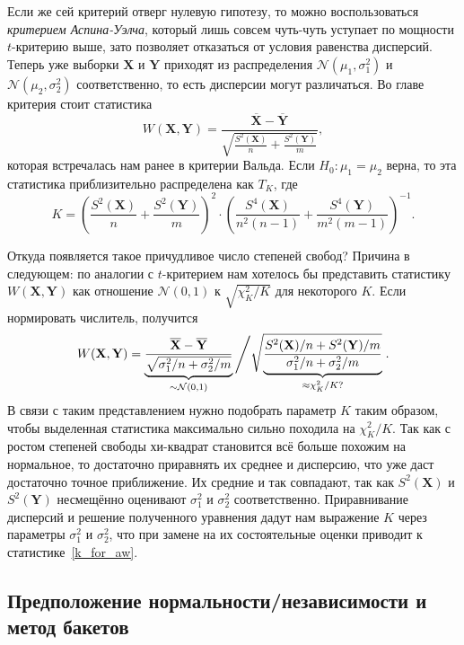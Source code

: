 Если же сей критерий отверг нулевую гипотезу, то можно воспользоваться \textit{критерием Аспина-Уэлча}, который лишь совсем чуть-чуть уступает по мощности $t$-критерию выше, зато позволяет отказаться от условия равенства дисперсий. Теперь уже выборки $\mathbf X$ и $\mathbf Y$ приходят из распределения $\mathcal{N}(\mu_1, \sigma_1^2)$ и $\mathcal{N}(\mu_2, \sigma_2^2)$ соответственно, то есть дисперсии могут различаться. Во главе критерия стоит статистика
\[
W(\mathbf X, \mathbf Y) = \frac{\overline{\mathbf X} - \overline{\mathbf Y}}{\sqrt{\frac{S^2(\mathbf X)}{n} + \frac{S^2(\mathbf Y)}{m}}},
\]
которая встречалась нам ранее в критерии Вальда. Если $H_0\colon \mu_1 = \mu_2$ верна, то эта статистика приблизительно распределена как $T_K$, где
\begin{equation}\label{k_for_aw}
    K = \left(\frac{S^2(\mathbf X)}{n} + \frac{S^2(\mathbf Y)}{m}\right)^2 \cdot \left(\frac{S^4(\mathbf X)}{n^2(n-1)} + \frac{S^4(\mathbf Y)}{m^2(m-1)}\right)^{-1}.
\end{equation}

Откуда появляется такое причудливое число степеней свобод? Причина в следующем: по аналогии с $t$-критерием нам хотелось бы представить статистику $W(\mathbf X, \mathbf Y)$ как отношение $\mathcal{N}(0, 1)$ к $\sqrt{\chi^2_K/K}$ для некоторого $K$. Если нормировать числитель, получится
\[
W(\mathbf X, \mathbf Y) = \underbrace{\frac{\overline{\mathbf X} - \overline{\mathbf Y}}{\sqrt{\sigma^2_1/n + \sigma^2_2/m}}}_{\sim \mathcal{N}(0, 1)} \left/ \sqrt{\lefteqn{\phantom{\frac{S^2(\mathbf X)/n + S^2(\mathbf Y)/m}{\sigma^2_1/n + \sigma^2_2/m}}} \smash{\underbrace{\frac{S^2(\mathbf X)/n + S^2(\mathbf Y)/m}{\sigma^2_1/n + \sigma^2_2/m}}_{\approx \chi^2_K/K?}}}\right. .
\]
В связи с таким представлением нужно подобрать параметр $K$ таким образом, чтобы выделенная статистика максимально сильно походила на $\chi^2_K/K$. Так как с ростом степеней свободы хи-квадрат становится всё больше похожим на нормальное, то достаточно приравнять их среднее и дисперсию, что уже даст достаточно точное приближение. Их средние и так совпадают, так как $S^2(\mathbf X)$ и $S^2(\mathbf Y)$ несмещённо оценивают $\sigma^2_1$ и $\sigma^2_2$ соответственно. Приравнивание дисперсий и решение полученного уравнения дадут нам выражение $K$ через параметры $\sigma^2_1$ и $\sigma^2_2$, что при замене на их состоятельные оценки приводит к статистике~\eqref{k_for_aw}.

\subsection{Предположение нормальности/независимости и метод бакетов}

